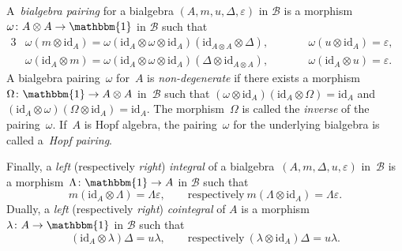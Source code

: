 \documentclass[10pt,a4paper]{amsart}
\numberwithin{equation}{section}
\newcommand{\co}{\colon}
\newcommand{\tens}{\otimes}
\newcommand{\id}{\mathrm{id}}
\newcommand{\mc}{\mathcal}
\newcommand{\uu}{\mathbbm{1}}
\newlength{\gnat}
\begin{document}
A~\textit{bialgebra pairing} for a bialgebra $(A,m,u, \Delta, \varepsilon)$ in $\mc B$ is a morphism~$\omega\co A \tens A \to \uu$ in $\mc B$ such that
\begin{alignat*}{3}
&\omega(m\tens \id_A)=\omega(\id_A\tens \omega\tens \id_A)(\id_{A\tens A}\tens \Delta), \qquad&& \omega(u\tens \id_A)= \varepsilon,&\\
&\omega(\id_A\tens m)=\omega(\id_A \tens \omega \tens \id_A)(\Delta \tens \id_{A\tens A}), \qquad&& \omega (\id_A \tens u) = \varepsilon.&
\end{alignat*}
A bialgebra pairing~$\omega$ for~$A$ is \textit{non-degenerate} if there exists a morphism~$\Omega\co \uu \to A\tens A$ in~$\mc B$ such that $(\omega\tens \id_A)(\id_A\tens\Omega)=\id_A$ and $(\id_A \tens \omega)(\Omega \tens \id_A)=\id_A$.
The morphism~$\Omega$ is called the \textit{inverse} of the pairing~$\omega$.
If~$A$ is Hopf algebra, the pairing~$\omega$ for the underlying bialgebra is called a~\textit{Hopf pairing}.

Finally, a \textit{left} (respectively \textit{right}) \emph{integral} of a bialgebra~$(A,m, \Delta,u, \varepsilon)$ in~$\mc B$ is a morphism~$\Lambda\co \uu \to A$ in $\mc B$ such that
\[m(\id_A\tens \Lambda)= \Lambda \varepsilon, \qquad \text{respectively} \ m(\Lambda \tens \id_A)=\Lambda \varepsilon.\]
Dually, a \textit{left} (respectively \textit{right}) \textit{cointegral} of $A$ is a morphism $\lambda \co A \to \uu$ in $\mc B$ such that
\[
(\id_A\tens \lambda )\Delta= u\lambda, \qquad \text{respectively} \ (\lambda \tens \id_A)\Delta= u \lambda.
\]
\end{document}
